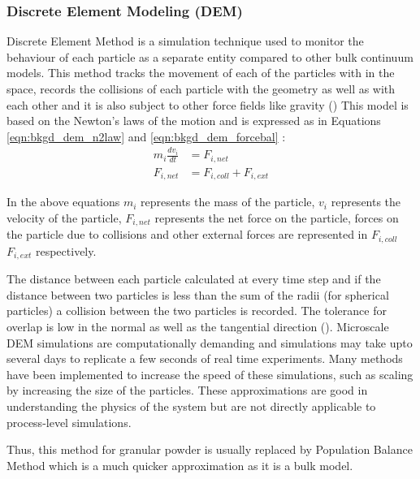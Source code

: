 \documentclass[preprint,11pt,authoryear]{elsarticle}
\begin{document}
	    \subsubsection{Discrete Element Modeling (DEM)}
	    \par Discrete Element Method is a simulation technique used to monitor the behaviour of each particle as a separate entity compared to other bulk continuum models. This method tracks the movement of each of the particles with in the space, records the collisions of each particle with the geometry as well as with each other and it is also subject to other force fields like gravity (\cite{Barrasso2015cerd})  This model is based on the Newton's laws of the motion and is expressed as in Equations \ref{eqn:bkgd_dem_n2law} and  \ref{eqn:bkgd_dem_forcebal} : \\
	\begin{align}
	m_i\frac{dv_i}{dt} &= F_{i,net} \label{eqn:bkgd_dem_n2law} \\
	F_{i,net} &=  F_{i,coll} +  F_{i,ext} \label{eqn:bkgd_dem_forcebal}
	\end{align}
	\par  In the above equations $m_i$ represents the mass of the particle, $v_i$ represents the velocity of the particle, $F_{i,net}$  represents the net force on the particle, forces on the particle due to collisions and other external forces are represented in $F_{i,coll}$ $F_{i,ext}$ respectively.
	\par The distance between each particle calculated at every time step and if the distance between two particles is less than the sum of the radii (for spherical particles)  a collision between the two particles is recorded. The tolerance for overlap is low in the normal as well as the tangential direction (\cite{Cundall1979}). Microscale DEM simulations are computationally demanding and simulations may take upto several days to replicate a few seconds of real time experiments. Many methods have been implemented to increase the speed of these simulations, such as scaling by increasing the size of the particles. These approximations are good in understanding the physics of the system but are not directly applicable to process-level simulations. 
	\par Thus, this method for granular powder is usually replaced by Population Balance Method which is a much quicker approximation as it is a bulk model.  
\end{document}
